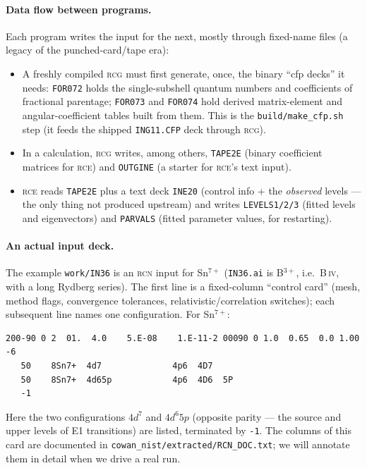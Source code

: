 \documentclass[11pt]{article}
\newcommand{\prog}[1]{\textsc{#1}}
\newcommand{\file}[1]{\texttt{#1}}
\begin{document}
\paragraph{Data flow between programs.} Each program writes the input for the
next, mostly through fixed-name files (a legacy of the punched-card/tape era):
\begin{itemize}[nosep]
\item A freshly compiled \prog{rcg} must first generate, once, the binary
``cfp decks'' it needs: \file{FOR072} holds the single-subshell quantum numbers
and coefficients of fractional parentage; \file{FOR073} and \file{FOR074} hold
derived matrix-element and angular-coefficient tables built from them. This is
the \file{build/make\_cfp.sh} step (it feeds the shipped \file{ING11.CFP} deck
through \prog{rcg}).
\item In a calculation, \prog{rcg} writes, among others, \file{TAPE2E}
(binary coefficient matrices for \prog{rce}) and \file{OUTGINE} (a starter for
\prog{rce}'s text input).
\item \prog{rce} reads \file{TAPE2E} plus a text deck \file{INE20} (control
info + the \emph{observed} levels --- the only thing not produced upstream) and
writes \file{LEVELS1/2/3} (fitted levels and eigenvectors) and \file{PARVALS}
(fitted parameter values, for restarting).
\end{itemize}

\paragraph{An actual input deck.} The example \file{work/IN36} is an \prog{rcn}
input for \mbox{Sn$^{7+}$} (\file{IN36.ai} is \mbox{B$^{3+}$}, i.e.\ B\,\textsc{iv},
with a long Rydberg series). The first line is a fixed-column ``control card''
(mesh, method flags, convergence tolerances, relativistic/correlation switches);
each subsequent line names one configuration. For \mbox{Sn$^{7+}$}:
\begin{verbatim}
200-90 0 2  01.  4.0    5.E-08    1.E-11-2 00090 0 1.0  0.65  0.0 1.00   -6
   50    8Sn7+  4d7              4p6  4D7
   50    8Sn7+  4d65p            4p6  4D6  5P
   -1
\end{verbatim}
Here the two configurations $4d^7$ and $4d^6 5p$ (opposite parity --- the source
and upper levels of E1 transitions) are listed, terminated by \texttt{-1}. The
columns of this card are documented in \file{cowan\_nist/extracted/RCN\_DOC.txt};
we will annotate them in detail when we drive a real run.
\end{document}
